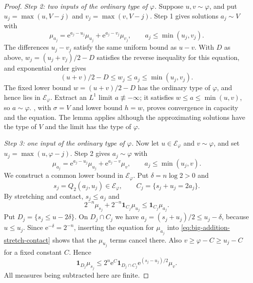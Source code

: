 \begin{proof}
\emph{Step 2: two inputs of the ordinary type of $\varphi$.}
Suppose $u,v\sim\varphi$, and put $u_j=\max(u,V-j)$ and $v_j=\max(v,V-j)$. Step 1 gives solutions $a_j\sim V$ with
\[
 \mu_{a_j}=\mathrm{e}^{a_j-u_j}\mu_{u_j}+\mathrm{e}^{a_j-v_j}\mu_{v_j},
 \qquad a_j\leq\min(u_j,v_j).
\]
The differences $u_j-v_j$ satisfy the same uniform bound as $u-v$. With $D$ as above, $w_j=(u_j+v_j)/2-D$ satisfies the reverse inequality for this equation, and exponential order gives
\[
 (u+v)/2-D\leq w_j\leq a_j\leq\min(u_j,v_j).
\]
The fixed lower bound $w=(u+v)/2-D$ has the ordinary type of $\varphi$, and hence lies in $\mathcal E_\varphi$. Extract an $L^1$ limit $a\not\equiv-\infty$; it satisfies $w\leq a\leq\min(u,v)$, so $a\sim\varphi$. , with $\sigma=V$ and lower bound $h=w$, proves convergence in capacity and the equation. The lemma applies although the approximating solutions have the type of $V$ and the limit has the type of $\varphi$.

\emph{Step 3: one input of the ordinary type of $\varphi$.}
Now let $u\in\mathcal E_\varphi$ and $v\sim\varphi$, and set $u_j=\max(u,\varphi-j)$. Step 2 gives $a_j\sim\varphi$ with
\[
 \mu_{a_j}=\mathrm{e}^{a_j-u_j}\mu_{u_j}+\mathrm{e}^{a_j-v}\mu_v,
 \qquad a_j\leq\min(u_j,v).
\]
We construct a common lower bound in $\mathcal E_\varphi$. Put $\delta=n\log2>0$ and
\[
 s_j=Q_2(a_j,u_j)\in\mathcal E_\varphi,
 \qquad C_j=\{s_j+u_j=2a_j\}.
\]
By stretching and contact, $s_j\leq a_j$ and
\begin{equation}\label{eq:big-addition-stretch-contact}
 2^{-n}\mu_{s_j}+2^{-n}\mathbf1_{C_j}\mu_{u_j}
 \leq\mathbf1_{C_j}\mu_{a_j}.
\end{equation}
Put $D_j=\{s_j\leq u-2\delta\}$. On $D_j\cap C_j$ we have $a_j=(s_j+u_j)/2\leq u_j-\delta$, because $u\leq u_j$. Since $\mathrm{e}^{-\delta}=2^{-n}$, inserting the equation for $\mu_{a_j}$ into \eqref{eq:big-addition-stretch-contact} shows that the $\mu_{u_j}$ terms cancel there. Also $v\geq\varphi-C\geq u_j-C$ for a fixed constant $C$. Hence
\begin{equation}\label{eq:big-addition-ordinary-tail}
 \mathbf1_{D_j}\mu_{s_j}
 \leq2^n \mathrm{e}^C\mathbf1_{D_j\cap C_j}
                \mathrm{e}^{(s_j-u_j)/2}\mu_v.
\end{equation}
All measures being subtracted here are finite.


\end{proof}
